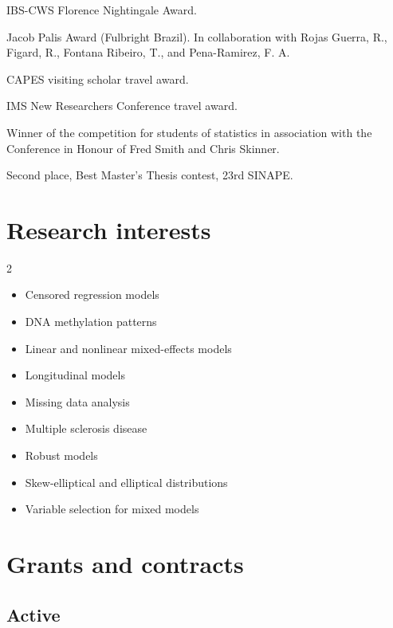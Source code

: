\documentclass[
  10pt,
  letterpaper,
]{article}
\providecommand{\tightlist}{%
  \setlength{\itemsep}{0pt}\setlength{\parskip}{0pt}}
\begin{document}
\begin{description}
\tightlist
\item[2026]
IBS-CWS Florence Nightingale Award.
\item[2025]
Jacob Palis Award (Fulbright Brazil). In collaboration with Rojas
Guerra, R., Figard, R., Fontana Ribeiro, T., and Pena-Ramirez, F. A.
\item[2024]
CAPES visiting scholar travel award.
\item[2023]
IMS New Researchers Conference travel award.
\item[2021]
Winner of the competition for students of statistics in association with
the Conference in Honour of Fred Smith and Chris Skinner.
\item[2018]
Second place, Best Master's Thesis contest, 23rd SINAPE.
\end{description}

\section{Research interests}\label{research-interests}

\begin{multicols}{2}\raggedright

\begin{itemize}
\tightlist
\item
  Censored regression models
\item
  DNA methylation patterns
\item
  Linear and nonlinear mixed-effects models
\item
  Longitudinal models
\item
  Missing data analysis
\item
  Multiple sclerosis disease
\item
  Robust models
\item
  Skew-elliptical and elliptical distributions
\item
  Variable selection for mixed models
\end{itemize}

\end{multicols}

\section{Grants and contracts}\label{grants-and-contracts}

\subsection{Active}\label{active}
\end{document}
